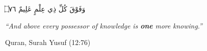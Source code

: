 



\begin{center}
{\arabicfont\Large \beginR وَفَوْقَ كُلِّ ذِي عِلْمٍ عَلِيمٌ ۝٧٦\endR}

\vspace{2em}

{\large\itshape
\enquote{And above every possessor of knowledge is \textbf{one} more knowing.}\par}

\vspace{1em}

{\normalsize Quran, Surah Yusuf (12:76)}
\end{center}
% 
\cleardoublepage



